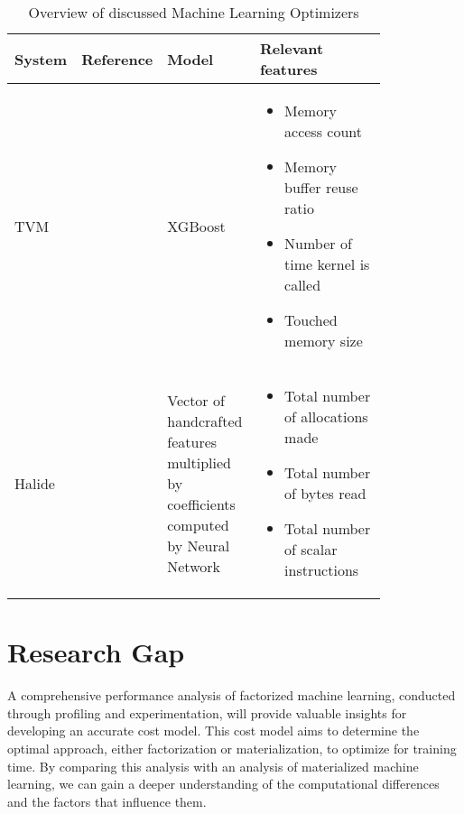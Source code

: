 \begin{table}[ht]
    \centering
    \begin{tabular}{p{0.10\linewidth}p{0.12\linewidth}p{0.25\linewidth}p{0.35\linewidth}}
        \toprule
        System & Reference                & Model                                                                                & Relevant features                                                                                                                                                                              \\ \midrule \midrule

        TVM    & \cite{tvm}               & XGBoost                                                                              & \begin{itemize}[noitemsep,topsep=0pt,leftmargin=0.3cm] \item Memory access count \item Memory buffer reuse ratio \item Number of time kernel is called \item Touched memory size \end{itemize} \\ \midrule
        Halide & \cite{halide_cost_model} & Vector of handcrafted features multiplied by coefficients computed by Neural Network & \begin{itemize}[noitemsep,topsep=0pt,leftmargin=0.3cm] \item Total number of allocations made \item Total number of bytes read \item Total number of scalar instructions \end{itemize}         \\ \bottomrule
    \end{tabular}
    \caption{Overview of discussed Machine Learning Optimizers}
    \label{tab:optimizer_overview}
\end{table}

\section{Research Gap}
A comprehensive performance analysis of factorized machine learning, conducted through profiling and experimentation, will provide valuable insights for developing an accurate cost model. This cost model aims to determine the optimal approach, either factorization or materialization, to optimize for training time. By comparing this analysis with an analysis of materialized machine learning, we can gain a deeper understanding of the computational differences and the factors that influence them.

